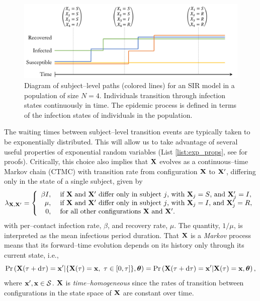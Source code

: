 \begin{figure}[htbp]
	\centering
	\includegraphics[width=0.8\linewidth]{figures/subject_sample_paths}
	\caption[Diagram of subject--level SIR paths.]{Diagram of subject--level paths (colored lines) for an SIR model in a population of size $ N=4 $. Individuals transition through infection states continuously in time. The epidemic process is defined in terms of the infection states of individuals in the population.}
	\label{fig:subjectsamplepaths}
\end{figure}

The waiting times between subject--level transition events are typically taken to be exponentially distributed. This will allow us to take advantage of several useful properties of exponential random variables (List \ref{list:exp_props}, see \cite{wilkinson2011stochastic} for proofs). Critically, this choice also implies that $ \mathbf{X} $ evolves as a continuous--time Markov chain (CTMC) with transition rate from configuration $ \mathbf{X} $ to $ \mathbf{X}^\prime $, differing only in the state of a single subject, given by
\begin{equation}
\lambda_{\mathbf{X},\mathbf{X}^\prime} = \left \lbrace \begin{array}{rl}
\beta I,\ &\text{if } \mathbf{X}\ \text{and } \mathbf{X}^\prime\ \text{differ only in subject }j \text{, with }\mathbf{X}_j=S\text{, and }\mathbf{X}_j^\prime=I,\\
\mu,\ &\text{if } \mathbf{X}\ \text{and } \mathbf{X}^\prime\ \text{differ only in subject }j \text{, with }\mathbf{X}_j=I\text{, and }\mathbf{X}_j^\prime=R,\\
0,\ & \text{for all other configurations }\mathbf{X}\ \text{and }\mathbf{X}^\prime.
\end{array}\right.
\end{equation}
with per--contact infection rate,  $ \beta $, and recovery rate, $ \mu $. The quantity, $ 1/\mu $, is interpreted as the mean infectious period duration. That $ \mathbf{X} $ is a \textit{Markov} process means that its forward--time evolution depends on its history only through its current state, i.e.,
\begin{equation}
\label{eqn:sir_markov}
\Pr\left (\bX(\tau + \dtau) = \bx^\prime | \lbrace\bX(\tau) = \bx,\ \tau\in[0,\tau]\rbrace, \btheta\right ) = \Pr\left (\bX(\tau + \dtau) = \bx^\prime | \bX(\tau) = \bx,\btheta\right ),
\end{equation}
where $ \mathbf{x}^\prime,\mathbf{x} \in \mathcal{S}$. $ \mathbf{X} $ is \textit{time--homogeneous} since the rates of transition between configurations in the state space of $ \mathbf{X} $ are constant over time. 


